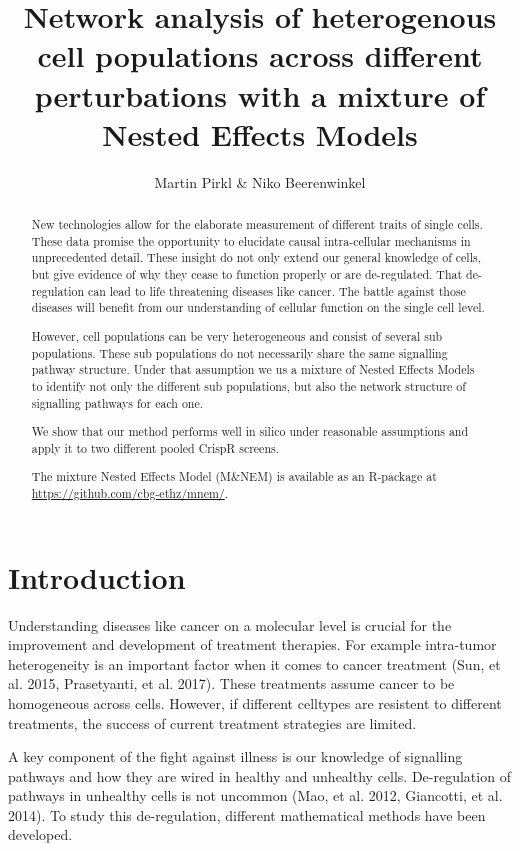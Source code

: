 \documentclass[12pt]{article}
\title{Network analysis of heterogenous cell populations across different perturbations with a mixture of Nested Effects Models}
\author{Martin Pirkl \& Niko Beerenwinkel}
\begin{document}
\maketitle

\begin{abstract}
New technologies allow for the elaborate measurement of different traits of single cells. These data promise the opportunity to elucidate causal intra-cellular mechanisms in unprecedented detail. These insight do not only extend our general knowledge of cells, but give evidence of why they cease to function properly or are de-regulated. That de-regulation can lead to life threatening diseases like cancer. The battle against those diseases will benefit from our understanding of cellular function on the single cell level.

However, cell populations can be very heterogeneous and consist of several sub populations. These sub populations do not necessarily share the same signalling pathway structure. Under that assumption we us a mixture of Nested Effects Models to identify not only the different sub populations, but also the network structure of signalling pathways for each one.

We show that our method performs well in silico under reasonable assumptions and apply it to two different pooled CrispR screens.

The mixture Nested Effects Model (M\&NEM) is available as an R-package at \url{https://github.com/cbg-ethz/mnem/}.
\end{abstract}

\section{Introduction}
Understanding diseases like cancer on a molecular level is crucial for the improvement and development of treatment therapies. For example intra-tumor heterogeneity is an important factor when it comes to cancer treatment (Sun, et al. 2015, Prasetyanti, et al. 2017). These treatments assume cancer to be homogeneous across cells. However, if different celltypes are resistent to different treatments, the success of current treatment strategies are limited.

A key component of the fight against illness is our knowledge of signalling pathways and how they are wired in healthy and unhealthy cells. De-regulation of pathways in unhealthy cells is not uncommon (Mao,  et al. 2012, Giancotti, et al. 2014). To study this de-regulation, different mathematical methods have been developed.
\end{document}
